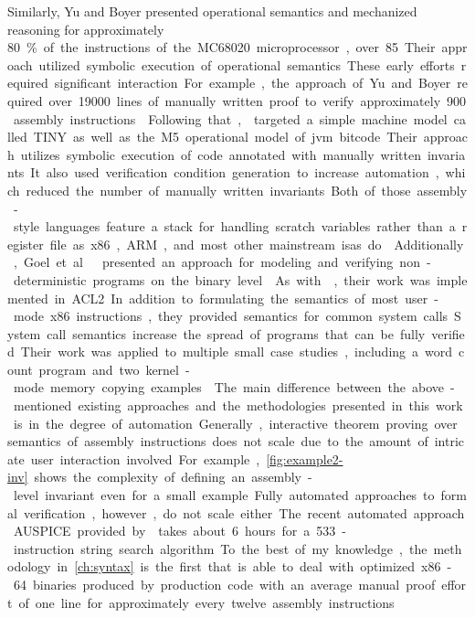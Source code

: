 Similarly, Yu and Boyer  \autocite{yu1993automated,boyer1996automated}
presented operational semantics and mechanized reasoning
for approximately \SI{80}\percent of the instructions of the MC68020 microprocessor,
over 85.
Their approach utilized symbolic execution of operational semantics.
These early efforts required significant interaction.
For example, the approach of Yu and Boyer required over \num{19000}
lines of manually written proof to verify approximately \num{900} assembly instructions.

Following that, \textcite{matthews2006verification}
targeted a simple machine model called TINY
as well as the M5 operational model of \ac{jvm} bitcode.
Their approach utilizes symbolic execution of code annotated
with manually written invariants.
It also used verification condition generation to increase automation,
which reduced the number of manually written invariants.
Both of those assembly-style languages feature a stack
for handling scratch variables rather than a register file
as x86, ARM, and most other mainstream \acp{isa} do.

Additionally, Goel et al.\ presented an approach for modeling and verifying
non-deterministic programs on the binary level \autocite{goel2014syscalls,goelphd}.
As with \textcite{matthews2006verification}, their work was implemented in ACL2.
In addition to formulating the semantics of most user-mode x86 instructions,
they provided semantics for common system calls.
System call semantics increase the spread of programs that can be fully verified.
Their work was applied to multiple small case studies,
including a word count program and two kernel-mode memory copying examples.
 
The main difference between the above-mentioned existing approaches
and the methodologies presented in this work is in the degree of automation.
Generally, interactive theorem proving over semantics of assembly instructions
does not scale due to the amount of intricate user interaction involved.
For example, \cref{fig:example2-inv} shows
the complexity of defining an assembly-level invariant even for a small example.

Fully automated approaches to formal verification, however, do not scale either.
The recent automated approach AUSPICE provided by \textcite{tan2015auspice}
takes about 6 hours for a 533-instruction string search algorithm.
To the best of my knowledge,
the methodology in \cref{ch:syntax} is the first that is able to deal with
optimized x86-64 binaries produced by production code
with an average manual proof effort of one line
for approximately every twelve assembly instructions.

